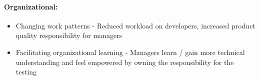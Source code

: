 \paragraph{Organizational:}
\begin{itemize}
	\item Changing work patterns - Reduced workload on developers, increased product quality responsibility for managers
	\item Facilitating organizational learning - Managers learn / gain more technical understanding and feel empowered by owning the responsibility for the testing
\end{itemize}
%
%
